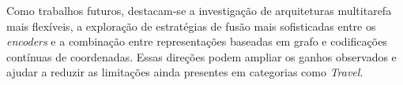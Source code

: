 Como trabalhos futuros, destacam-se a investigação de arquiteturas multitarefa mais flexíveis, a exploração de estratégias de fusão mais sofisticadas entre os \textit{encoders} e a combinação entre representações baseadas em grafo e codificações contínuas de coordenadas. Essas direções podem ampliar os ganhos observados e ajudar a reduzir as limitações ainda presentes em categorias como \textit{Travel}.

